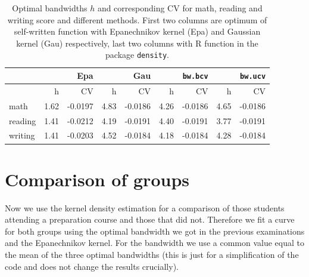 \begin{table}[!t]
\centering
\begin{tabular}{lrrrrrrrr}
  \hline
 & \multicolumn{2}{r}{Epa} &  \multicolumn{2}{r}{Gau}&  \multicolumn{2}{r}{\texttt{bw.bcv}}&  \multicolumn{2}{r}{\texttt{bw.ucv}} \\  
\hline
 & h & CV & h & CV & h & CV & h & CV \\ 
  \hline
math & 1.62 & -0.0197 & 4.83 & -0.0186 & 4.26 & -0.0186 & 4.65 & -0.0186 \\ 
  reading & 1.41 & -0.0212 & 4.19 & -0.0191 & 4.40 & -0.0191 & 3.77 & -0.0191 \\ 
  writing & 1.41 & -0.0203 & 4.52 & -0.0184 & 4.18 & -0.0184 & 4.28 & -0.0184 \\ 
   \hline
\end{tabular}
\caption{Optimal bandwidths $h$ and corresponding CV for math, reading and writing score and different methods. First two columns are optimum of self-written function with Epanechnikov kernel (Epa) and Gaussian kernel (Gau) respectively, last two columns with R function in the package \texttt{density}.}
\label{6table}
\end{table}


\section{Comparison of groups}
Now we use the kernel density estimation for a comparison of those students attending a preparation course and those that did not. Therefore we fit a curve for both groups using the optimal bandwidth we got in the previous examinations and the Epanechnikov kernel. For the bandwidth we use a common value equal to the mean of the three optimal bandwidths (this is just for a simplification of the code and does not change the results crucially). 

